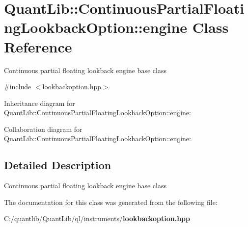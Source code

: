 \section{Quant\+Lib\+:\+:Continuous\+Partial\+Floating\+Lookback\+Option\+:\+:engine Class Reference}
\label{class_quant_lib_1_1_continuous_partial_floating_lookback_option_1_1engine}


Continuous partial floating lookback engine base class  




{\ttfamily \#include $<$lookbackoption.\+hpp$>$}



Inheritance diagram for Quant\+Lib\+:\+:Continuous\+Partial\+Floating\+Lookback\+Option\+:\+:engine\+:


Collaboration diagram for Quant\+Lib\+:\+:Continuous\+Partial\+Floating\+Lookback\+Option\+:\+:engine\+:


\subsection{Detailed Description}
Continuous partial floating lookback engine base class 

The documentation for this class was generated from the following file\+:\begin{DoxyCompactItemize}
\item 
C\+:/quantlib/\+Quant\+Lib/ql/instruments/{\bf lookbackoption.\+hpp}\end{DoxyCompactItemize}
